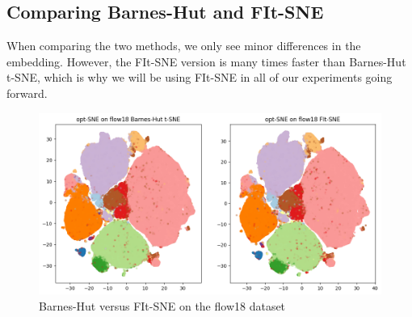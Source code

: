 \subsection{Comparing Barnes-Hut and FIt-SNE}
When comparing the two methods, we only see minor differences in the embedding. 
However, the FIt-SNE version is many times faster than Barnes-Hut t-SNE, which is why we will be using FIt-SNE in all of our experiments going forward. 
\begin{figure}[h]
    \centering 
    \includegraphics[width=\linewidth]{figures/BH_vs_FFT.png}
    \caption{Barnes-Hut versus FIt-SNE on the flow18 dataset}
    \label{fig:BH_vs_FIt-SNE}
\end{figure}
